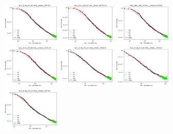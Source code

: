 \documentclass{article} %
\begin{document}
\begin{figure}[!htb]
\includegraphics[width=0.245\textwidth]{figures/scaling_laws_benchmark_dataset_plots__all_functional_forms/birds_10___BiT_50_1.png}
\includegraphics[width=0.245\textwidth]{figures/scaling_laws_benchmark_dataset_plots__all_functional_forms/birds_10___BiT_101_3.png}
\includegraphics[width=0.245\textwidth]{figures/scaling_laws_benchmark_dataset_plots__all_functional_forms/birds_10___MiX_B_16.png}
\includegraphics[width=0.245\textwidth]{figures/scaling_laws_benchmark_dataset_plots__all_functional_forms/birds_10___MiX_L_16.png}
\includegraphics[width=0.245\textwidth]{figures/scaling_laws_benchmark_dataset_plots__all_functional_forms/birds_10___ViT_B_16.png}
\includegraphics[width=0.245\textwidth]{figures/scaling_laws_benchmark_dataset_plots__all_functional_forms/birds_10___ViT_S_16.png}
\includegraphics[width=0.245\textwidth]{figures/scaling_laws_benchmark_dataset_plots__all_functional_forms/birds_25___BiT_50_1.png}

\end{figure}
\end{document}
